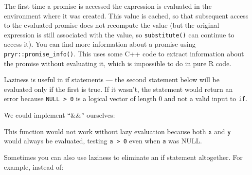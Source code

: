 The first time a promise is accessed the expression is evaluated in the
environment where it was created. This value is cached, so that
subsequent access to the evaluated promise does not recompute the value
(but the original expression is still associated with the value, so
\texttt{substitute()} can continue to access it). You can find more
information about a promise using \texttt{pryr::promise\_info()}. This
uses some C++ code to extract information about the promise without
evaluating it, which is impossible to do in pure R code.

Laziness is useful in if statements --- the second statement below will
be evaluated only if the first is true. If it wasn't, the statement
would return an error because \texttt{NULL \textgreater{} 0} is a
logical vector of length 0 and not a valid input to \texttt{if}.

\begin{Shaded}
\begin{Highlighting}[]
\StringTok{ }
\StringTok{ }\StringTok{ }\NormalTok{) \{}

\NormalTok{\}}
\end{Highlighting}
\end{Shaded}

We could implement ``\&\&'' ourselves:

\begin{Shaded}
\begin{Highlighting}[]
\DataTypeTok{&&} \NormalTok{<-}\StringTok{ }
  \NormalTok{(}\NormalTok{)}
  \NormalTok{(}\NormalTok{)}

\NormalTok{\}}
\StringTok{ }
\NormalTok{!}\StringTok{ }\StringTok{ }
\end{Highlighting}
\end{Shaded}

This function would not work without lazy evaluation because both
\texttt{x} and \texttt{y} would always be evaluated, testing
\texttt{a \textgreater{} 0} even when \texttt{a} was NULL.

Sometimes you can also use laziness to eliminate an if statement
altogether. For example, instead of:

